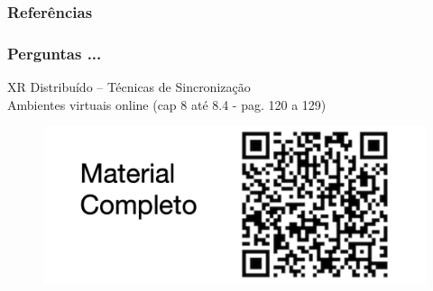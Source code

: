 \documentclass{beamer}
\begin{document}
\begin{frame}
  \frametitle{Referências}
  \begingroup
  \footnotesize
  
  
  \endgroup
\end{frame}

\begin{frame}
  \frametitle{Perguntas ...}
  XR Distribuído – Técnicas de Sincronização \\
  Ambientes virtuais online (cap 8 até 8.4 - pag. 120 a 129)
  \begin{figure}[h]
    \centering
    \vspace{-18pt}
    \includegraphics[width=1.03\textwidth]{../qrcode_udesc_trabalho_05.png}
    \vspace{-20pt}
  \end{figure}
\end{frame}
\end{document}

